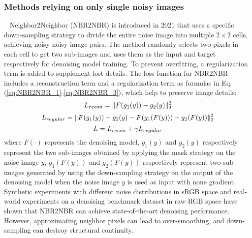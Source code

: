 \documentclass[conference]{IEEEtran}
\begin{document}
\subsubsection{Methods relying on only single noisy images}
\
\newline
\noindent Neighbor2Neighbor (NBR2NBR) \cite{huang2021neighbor2neighbor} is introduced in 2021 that uses a specific down-sampling strategy to divide the entire noise image into multiple $2\times2$ cells, achieving noisy-noisy image pairs. The method randomly selects two pixels in each cell to get two sub-images and uses them as the input and target respectively for denoising model training. To prevent overfitting, a regularization term is added to supplement lost details.
The loss function for NBR2NBR includes a reconstruction term and a regularization term as formulas in Eq. (\ref{eq:NBR2NBR_1}-\ref{eq:NBR2NBR_3}), which help to preserve image details:
\begin{equation}
	\setlength{\abovedisplayskip}{0pt}
	\setlength{\belowdisplayskip}{0pt}
	L_{recon} = \Vert F(g_1(y)) -g_2(y)\Vert_{2}^{2}
	\label{eq:NBR2NBR_1}
\end{equation}
\begin{equation}
	\setlength{\abovedisplayskip}{0pt}
	\setlength{\belowdisplayskip}{0pt}
	L_{regular} = \Vert F(g_1(y)) - g_2(y) - F(g_1(F(y))) - g_2(F(y))\Vert_{2}^{2}
	\label{eq:NBR2NBR_2}
\end{equation}
\begin{equation}
	\setlength{\abovedisplayskip}{0pt}
	\setlength{\belowdisplayskip}{0pt}
	L = L_{recon} + \gamma L_{regular}
	\label{eq:NBR2NBR_3}
\end{equation}
where $F(\cdot)$ represents the denoising model, $g_1 (y)$ and $g_2 (y)$ respectively represent the two sub-images obtained by applying the mask strategy on the noise image $y$, $g_1 (F(y))$ and $g_2 (F(y))$ respectively represent two sub-images generated by using the down-sampling strategy on the output of the denoising model when the noise image $y$ is used as input with none gradient.
Synthetic experiments with different noise distributions in sRGB space and real-world experiments on a denoising benchmark dataset in raw-RGB space have shown that NBR2NBR can achieve state-of-the-art denoising performance.
However, approximating neighbor pixels can lead to over-smoothing, and down-sampling can destroy structural continuity.
\end{document}
